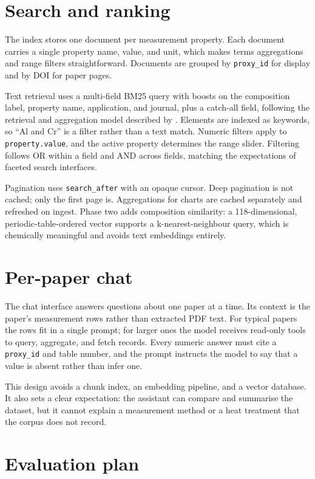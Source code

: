 \documentclass[11pt,a4paper]{article}
\begin{document}
\section{Search and ranking}

The index stores one document per measurement property. Each document carries a
single property name, value, and unit, which makes terms aggregations and range
filters straightforward. Documents are grouped by \texttt{proxy\_id} for display
and by DOI for paper pages.

Text retrieval uses a multi-field BM25 query with boosts on the composition
label, property name, application, and journal, plus a catch-all field, following
the retrieval and aggregation model described by \citet{gormley2015}. Elements
are indexed as keywords, so ``Al and Cr'' is a filter rather than a text match.
Numeric filters apply to \texttt{property.value}, and the active property
determines the range slider. Filtering follows OR within a field and AND across
fields, matching the expectations of faceted search interfaces.

Pagination uses \texttt{search\_after} with an opaque cursor. Deep pagination is
not cached; only the first page is. Aggregations for charts are cached
separately and refreshed on ingest. Phase two adds composition similarity: a
118-dimensional, periodic-table-ordered vector supports a k-nearest-neighbour
query, which is chemically meaningful and avoids text embeddings entirely.

\section{Per-paper chat}

The chat interface answers questions about one paper at a time. Its context is
the paper's measurement rows rather than extracted PDF text. For typical papers
the rows fit in a single prompt; for larger ones the model receives read-only
tools to query, aggregate, and fetch records. Every numeric answer must cite a
\texttt{proxy\_id} and table number, and the prompt instructs the model to say
that a value is absent rather than infer one.

This design avoids a chunk index, an embedding pipeline, and a vector database.
It also sets a clear expectation: the assistant can compare and summarise the
dataset, but it cannot explain a measurement method or a heat treatment that the
corpus does not record.

\section{Evaluation plan}
\end{document}
